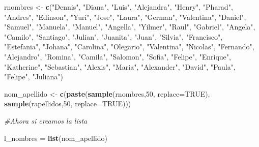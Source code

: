 \documentclass[
]{article}
\newenvironment{Shaded}{\begin{snugshade}}{\end{snugshade}}
\newcommand{\AttributeTok}[1]{\textcolor[rgb]{0.13,0.29,0.53}{#1}}
\newcommand{\CommentTok}[1]{\textcolor[rgb]{0.56,0.35,0.01}{\textit{#1}}}
\newcommand{\ConstantTok}[1]{\textcolor[rgb]{0.56,0.35,0.01}{#1}}
\newcommand{\DecValTok}[1]{\textcolor[rgb]{0.00,0.00,0.81}{#1}}
\newcommand{\FunctionTok}[1]{\textcolor[rgb]{0.13,0.29,0.53}{\textbf{#1}}}
\newcommand{\NormalTok}[1]{#1}
\newcommand{\OtherTok}[1]{\textcolor[rgb]{0.56,0.35,0.01}{#1}}
\newcommand{\StringTok}[1]{\textcolor[rgb]{0.31,0.60,0.02}{#1}}
\begin{document}
\begin{Shaded}
\begin{Highlighting}[]
\NormalTok{rnombres }\OtherTok{\textless{}{-}} \FunctionTok{c}\NormalTok{(}\StringTok{"Dennis"}\NormalTok{, }\StringTok{"Diana"}\NormalTok{, }\StringTok{"Luis"}\NormalTok{, }\StringTok{"Alejandra"}\NormalTok{, }\StringTok{"Henry"}\NormalTok{, }\StringTok{"Pharad"}\NormalTok{, }\StringTok{"Andres"}\NormalTok{, }\StringTok{"Edinson"}\NormalTok{, }\StringTok{"Yuri"}\NormalTok{, }\StringTok{"Jose"}\NormalTok{, }\StringTok{"Laura"}\NormalTok{, }\StringTok{"German"}\NormalTok{, }\StringTok{"Valentina"}\NormalTok{, }\StringTok{"Daniel"}\NormalTok{, }\StringTok{"Samuel"}\NormalTok{, }\StringTok{"Manuela"}\NormalTok{, }\StringTok{"Manuel"}\NormalTok{, }\StringTok{"Angella"}\NormalTok{, }\StringTok{"Yilmer"}\NormalTok{, }\StringTok{"Raul"}\NormalTok{, }\StringTok{"Gabriel"}\NormalTok{, }\StringTok{"Angela"}\NormalTok{, }\StringTok{"Camilo"}\NormalTok{, }\StringTok{"Santiago"}\NormalTok{, }\StringTok{"Julian"}\NormalTok{, }\StringTok{"Juanita"}\NormalTok{, }\StringTok{"Juan"}\NormalTok{, }\StringTok{"Silvia"}\NormalTok{, }\StringTok{"Francisco"}\NormalTok{, }\StringTok{"Estefania"}\NormalTok{, }\StringTok{"Johana"}\NormalTok{, }\StringTok{"Carolina"}\NormalTok{, }\StringTok{"Olegario"}\NormalTok{, }\StringTok{"Valentina"}\NormalTok{, }\StringTok{"Nicolas"}\NormalTok{, }\StringTok{"Fernando"}\NormalTok{, }\StringTok{"Alejandro"}\NormalTok{, }\StringTok{"Romina"}\NormalTok{, }\StringTok{"Camila"}\NormalTok{, }\StringTok{"Salomon"}\NormalTok{, }\StringTok{"Sofia"}\NormalTok{, }\StringTok{"Felipe"}\NormalTok{, }\StringTok{"Enrique"}\NormalTok{, }\StringTok{"Katherine"}\NormalTok{, }\StringTok{"Sebastian"}\NormalTok{, }\StringTok{"Alexis"}\NormalTok{, }\StringTok{"Maria"}\NormalTok{, }\StringTok{"Alexander"}\NormalTok{, }\StringTok{"David"}\NormalTok{, }\StringTok{"Paula"}\NormalTok{, }\StringTok{"Felipe"}\NormalTok{, }\StringTok{"Juliana"}\NormalTok{)}

\NormalTok{nom\_apellido }\OtherTok{\textless{}{-}} \FunctionTok{c}\NormalTok{(}\FunctionTok{paste}\NormalTok{(}\FunctionTok{sample}\NormalTok{(rnombres,}\DecValTok{50}\NormalTok{, }\AttributeTok{replace=}\ConstantTok{TRUE}\NormalTok{), }\FunctionTok{sample}\NormalTok{(rapellidos,}\DecValTok{50}\NormalTok{, }\AttributeTok{replace=}\ConstantTok{TRUE}\NormalTok{)))}

\CommentTok{\#Ahora si creamos la lista}

\NormalTok{l\_nombres }\OtherTok{=} \FunctionTok{list}\NormalTok{(nom\_apellido)}
\end{Highlighting}
\end{Shaded}
\end{document}
